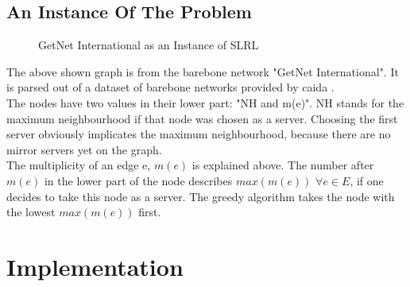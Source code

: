 \documentclass [12pt]{article}
\begin{document}
\subsection{An Instance Of The Problem}
\begin{figure}[H]
  \centering
  \caption{GetNet International as an Instance of SLRL}
\end{figure}
The above shown graph is from the barebone network "GetNet International".
It is parsed out of a dataset of barebone networks provided by caida \cite{caidabarebones}.
\\
The nodes have two values in their lower part: "NH and m(e)". NH stands for 
the maximum neighbourhood if that node was chosen as a server. Choosing the first
server obviously implicates the maximum neighbourhood, because there are
no mirror servers yet on the graph.\\
The multiplicity of an edge e, $m(e)$ is explained above. The number after
$m(e)$ in the lower part of the node describes $max(m(e))$ $ \forall e \in E$,
if one decides to take this node as a server.
The greedy algorithm takes the node with the lowest $max(m(e))$ first.

\section{Implementation}
\end{document}
